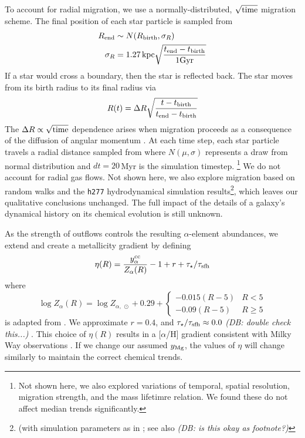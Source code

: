 \documentclass[fleqn,
usenatbib]{mnras}
\newcommand{\JJ}{\citetalias{james+21}}
\newcommand{\dbnote}[1]{ {\color{Thistle} \textit{\small (DB: #1)}} }
\begin{document}
To account for radial migration, we use a normally-distributed, $\sqrt{\rm time}$ migration scheme. The final position of each star particle is sampled from
\begin{subequations}
\begin{align}
        R_{\rm end} &\sim N(R_{\rm birth}, \sigma_R ) \\
        \sigma_{R} &= 1.27\,{\rm kpc} \sqrt{\frac{t_{\rm end} - t_{\rm birth}}{1 \rm Gyr}}
\end{align}
\end{subequations}
If a star would cross a boundary, then the star is reflected back.
The star moves from its birth radius to its final radius via
\begin{equation}
        R(t) = \Delta R \sqrt{\frac{t - t_{\rm birth}}{t_{\rm end} - t_{\rm birth}}}
\end{equation}
The $\Delta R \propto \sqrt{\rm time}$ dependence arises when migration proceeds as a consequence of the diffusion of angular momentum \citep{frankel18, frankel20}.
At each time step, each star particle travels a radial distance sampled from 
where $N(\mu, \sigma)$ represents a draw from normal distribution and $dt=20$\,Myr is the simulation timestep.%
\footnote{Not shown here, we also explored variations of temporal, spatial resolution, migration strength, and the mass lifetimre relation. We found these do not affect median trends significantly.}
We do not account for radial gas flows.
Not shown here, we also explore migration based on random walks and the \texttt{h277} hydrodynamical
simulation results\footnote{(with simulation parameters as in \citealt{bird+21}; see also \citealt{christensen12, zolotov12, loebman12, BZ14} \dbnote{is this okay as footnote?} }, which leaves our qualitative conclusions unchanged. 
The full impact of the details of a galaxy's dynamical history on its chemical evolution is still unknown.

As the strength of outflows controls the resulting $\alpha$-element abundances, we extend \JJ and create a metallicity gradient by defining
\begin{equation}\label{eq:mass_loading}
\eta(R) = \frac{y_{\alpha}^{\rm cc}}{Z_{\alpha}(R)} -1 + r + \tau_{\star} / \tau_{\rm sfh} 
\end{equation}
where 
\begin{equation}
    \log Z_{\alpha}(R) = \log Z_{\alpha,\ \odot} + 
    0.29 + 
    \begin{cases}
        -0.015(R-5) & R < 5 \\
        -0.09(R-5) & R \geq 5
    \end{cases}
\end{equation}
is adapted from \citet{hayden+14}.  We approximate $r=0.4$, and $\tau_\star/\tau_{\rm sfh} \approx 0.0$ \dbnote{double check this...}.
This choice of $\eta(R)$ results in a [$\alpha$/H] gradient consistent with Milky Way observations \citep[e.g.][]{hayden+14, weinberg+19, frinchaboy+13}.
If we change our assumed $y_{\rm Mg}$, the values of $\eta$ will change similarly to maintain the correct chemical trends.
\end{document}
